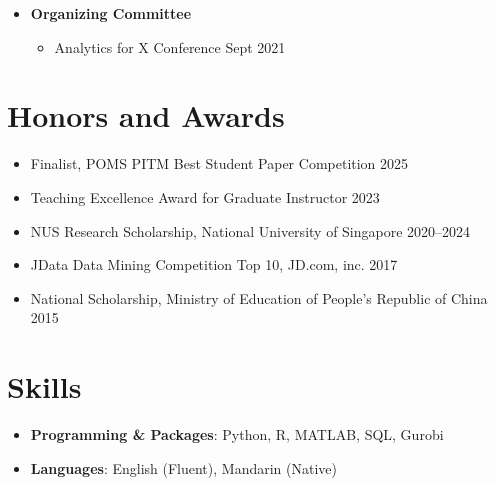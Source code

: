 \documentclass[12pt, a4paper]{article}
\begin{document}
{\begin{itemize}
	\item[] \textbf{Organizing Committee}
	\begin{itemize}
		\item Analytics for X Conference \hfill Sept 2021
	\end{itemize}


\end{itemize}




\section*{Honors and Awards}

\begin{itemize}[leftmargin=30pt]
	\item Finalist, POMS PITM Best Student Paper Competition \hfill 2025
	\item Teaching Excellence Award for Graduate Instructor \hfill 2023
	\item NUS Research Scholarship, National University of Singapore \hfill 2020--2024
	\item JData Data Mining Competition Top 10, JD.com, inc. \hfill 2017
	\item National Scholarship, Ministry of Education of People's Republic of China \hfill 2015
\end{itemize}




\section*{Skills}

\begin{itemize}
	\item[] \textbf{Programming \& Packages}: Python, R, MATLAB, SQL, Gurobi
	\item[] \textbf{Languages}: English (Fluent), Mandarin (Native)
\end{itemize}


}
\end{document}
